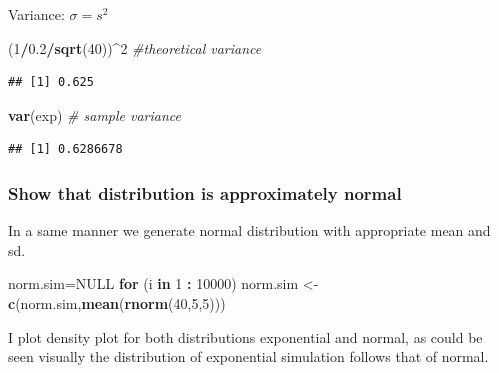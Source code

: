 \documentclass[
]{article}
\newenvironment{Shaded}{\begin{snugshade}}{\end{snugshade}}
\newcommand{\CommentTok}[1]{\textcolor[rgb]{0.56,0.35,0.01}{\textit{#1}}}
\newcommand{\ControlFlowTok}[1]{\textcolor[rgb]{0.13,0.29,0.53}{\textbf{#1}}}
\newcommand{\DecValTok}[1]{\textcolor[rgb]{0.00,0.00,0.81}{#1}}
\newcommand{\FloatTok}[1]{\textcolor[rgb]{0.00,0.00,0.81}{#1}}
\newcommand{\KeywordTok}[1]{\textcolor[rgb]{0.13,0.29,0.53}{\textbf{#1}}}
\newcommand{\NormalTok}[1]{#1}
\newcommand{\OperatorTok}[1]{\textcolor[rgb]{0.81,0.36,0.00}{\textbf{#1}}}
\newcommand{\OtherTok}[1]{\textcolor[rgb]{0.56,0.35,0.01}{#1}}
\newcommand{\StringTok}[1]{\textcolor[rgb]{0.31,0.60,0.02}{#1}}
\begin{document}
Variance: \(\sigma=s^2\)

\begin{Shaded}
\begin{Highlighting}[]
\NormalTok{(}\DecValTok{1}\OperatorTok{/}\FloatTok{0.2}\OperatorTok{/}\KeywordTok{sqrt}\NormalTok{(}\DecValTok{40}\NormalTok{))}\OperatorTok{^}\DecValTok{2} \CommentTok{#theoretical variance}
\end{Highlighting}
\end{Shaded}

\begin{verbatim}
## [1] 0.625
\end{verbatim}

\begin{Shaded}
\begin{Highlighting}[]
\KeywordTok{var}\NormalTok{(exp) }\CommentTok{# sample variance}
\end{Highlighting}
\end{Shaded}

\begin{verbatim}
## [1] 0.6286678
\end{verbatim}

\hypertarget{show-that-distribution-is-approximately-normal}{%
\subsubsection{Show that distribution is approximately
normal}\label{show-that-distribution-is-approximately-normal}}

In a same manner we generate normal distribution with appropriate mean
and sd.

\begin{Shaded}
\begin{Highlighting}[]
\NormalTok{norm.sim=}\OtherTok{NULL}
\ControlFlowTok{for}\NormalTok{ (i }\ControlFlowTok{in} \DecValTok{1} \OperatorTok{:}\StringTok{ }\DecValTok{10000}\NormalTok{) norm.sim <-}\StringTok{ }\KeywordTok{c}\NormalTok{(norm.sim,}\KeywordTok{mean}\NormalTok{(}\KeywordTok{rnorm}\NormalTok{(}\DecValTok{40}\NormalTok{,}\DecValTok{5}\NormalTok{,}\DecValTok{5}\NormalTok{)))}
\end{Highlighting}
\end{Shaded}

I plot density plot for both distributions exponential and normal, as
could be seen visually the distribution of exponential simulation
follows that of normal.
\end{document}
